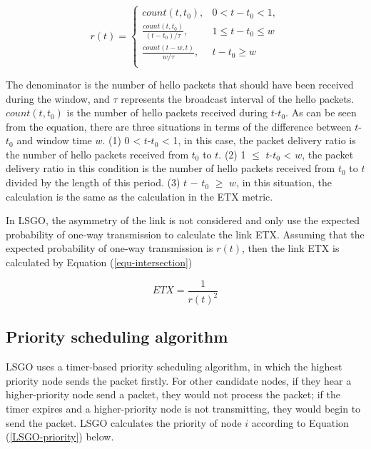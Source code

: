 \documentclass[conference]{IEEEtran}
\begin{document}
\begin{equation}
\label{trans-prediction}
r(t) =\begin{cases}count(t, t_{0}), & 0 < t - t_{0} < 1,  \\ \frac{count(t,t_{0})}{(t-t_{0}) / \tau}, & 1 \leq t - t_{0} \leq w\\
\frac{count(t - w,t)}{w / \tau}, &  t - t_{0} \geq w\\
\end{cases}
\end{equation}

The denominator is the number of hello packets that should have been received during the window, and $\tau$ represents the broadcast interval of the hello packets. $count(t,t_{0})$ is the number of hello packets received during $t$-$t_{0}$.  
As can be seen from the equation, there are three situations in terms of the difference between $t$-$t_{0}$ and window time $w$. (1) 0 < $t$-$t_{0}$ < 1, in this case, the packet delivery ratio is the number of hello packets received from $t_{0}$ to $t$. (2) 1 $\leq$ $t$-$t_{0}$ < $w$, the packet delivery ratio in this condition is the number of hello packets received from $t_{0}$ to $t$ divided by the length of this period. (3) $t$ − $t_{0}$ $\geq$ $w$, in this situation, the calculation is the same as the calculation in the ETX metric.

In LSGO, the asymmetry of the link is not considered and only use the expected probability of one-way transmission  to calculate the link ETX. 
Assuming that the expected probability of  one-way  transmission  is $r(t)$, then the link ETX is calculated by Equation (\ref{equ-intersection})
 
 \begin{equation}
 \label{equ-intersection}
 ETX = \frac{1}{  {r(t)}^{2}   } 
 \end{equation}



\subsection{Priority scheduling algorithm}
LSGO uses a timer-based priority scheduling algorithm, in which the highest priority node sends the packet firstly. For other candidate nodes, if they hear a higher-priority node send a packet, they would not process the packet; if the timer expires and a higher-priority node is not transmitting, they would begin to send the packet.  LSGO calculates the priority of node $i$ according to Equation (\ref{LSGO-priority}) below.
\end{document}
